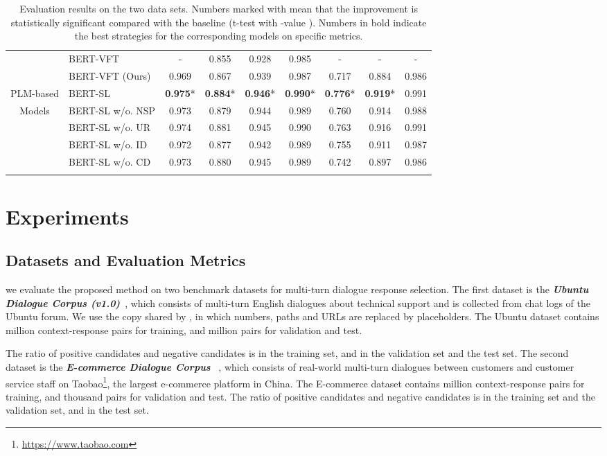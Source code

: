 \documentclass{article}
\newcommand{\thickhline}{\noalign{\hrule height 1pt}}
\begin{document}
\begin{table*}[ht!]
{\begin{tabular}{c|l|c|c|c|c|c|c|c}
      & BERT-VFT~\cite{whang2020domain} & - & 0.855 & 0.928 & 0.985 & - & - & - \\
      & BERT-VFT (Ours)\Tstrut & 0.969 & 0.867 & 0.939 & 0.987 &  0.717 & 0.884 & 0.986\\\cline{2-9}
      PLM-based & {BERT-SL} \Tstrut & \textbf{0.975}* & \textbf{0.884}* & \textbf{0.946}* & \textbf{0.990}* & \textbf{0.776}* & \textbf{0.919}* & 0.991\\ \cline{2-9}
      Models & {BERT-SL} w/o.  NSP \Tstrut& 0.973 & 0.879 & 0.944 & 0.989 & 0.760 & 0.914 & 0.988 \\
      & {BERT-SL} w/o. UR & 0.974 & 0.881 & 0.945 & 0.990 & 0.763 & 0.916 & 0.991 \\
      & {BERT-SL} w/o. ID & 0.972 & 0.877 & 0.942 & 0.989 & 0.755 & 0.911 & 0.987 \\
      & {BERT-SL} w/o. CD & 0.973 & 0.880 & 0.945 & 0.989 & 0.742 & 0.897 & 0.986 \\ 
      \thickhline 
    \end{tabular}
    }
\caption{Evaluation results on the two data sets.   Numbers marked with  mean that the improvement is statistically significant compared with the baseline (t-test with -value ). Numbers in bold indicate the best strategies for the corresponding models on specific metrics.} 
\label{exp:main-results}
  \end{table*} \section{Experiments}
\subsection{Datasets and Evaluation Metrics}
we evaluate the proposed method on two benchmark datasets for multi-turn dialogue response selection.
The first dataset is the \emph{\textbf{Ubuntu Dialogue Corpus (v1.0)}}~\cite{lowe-etal-2015-ubuntu}, which consists of multi-turn English dialogues about technical support and is collected from chat logs of the Ubuntu forum.
We use the copy shared by \citet{gu2020speaker}, in which numbers, paths and URLs are replaced by placeholders.
The Ubuntu dataset contains  million context-response pairs for training, and  million pairs for validation and test.

The ratio of positive candidates and negative candidates is  in the training set, and  in the validation set and the test set. The second dataset is the \emph{\textbf{E-commerce Dialogue Corpus}} ~\cite{zhang-etal-2018-modeling},
which consists of real-world multi-turn dialogues between customers and customer service staff on Taobao\footnote{\url{https://www.taobao.com}}, the largest e-commerce platform in China.
The E-commerce dataset contains  million context-response pairs for training, and  thousand pairs for validation and test.
The ratio of positive candidates and negative candidates is  in the training set and the validation set, and  in the test set.
\end{document}
